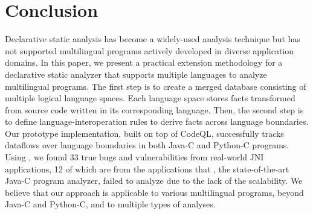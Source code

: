 \section{Conclusion}\label{sec:conclude}
Declarative static analysis has become a widely-used analysis technique but
has not supported multilingual programs actively developed in diverse
application domains.
In this paper, we present a practical extension methodology for a declarative static
analyzer that supports multiple languages to analyze multilingual programs.
The first step is to create a merged database consisting of multiple logical language
spaces. Each language space stores facts transformed from source code written in its
corresponding language.
Then, the second step is to define language-interoperation rules to derive facts
across language boundaries.
Our prototype implementation, \ours built on top of CodeQL, successfully tracks dataflows
over language boundaries in both Java-C and Python-C programs.
Using \ours, we found 33 true bugs and vulnerabilities from real-world
JNI applications, 12 of which are from the applications that \lees,
the state-of-the-art Java-C program analyzer, failed to analyze due to the lack
of the scalability.
We believe that our approach is applicable to various multilingual programs,
beyond Java-C and Python-C, and to multiple types of analyses.

